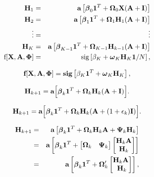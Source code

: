 \documentclass[letterpaper,twoside,openany, titlepage,oldfontcommands,titles,dvipsnames]{memoir}
\begin{document}
\begin{eqnarray}\label{eq:graph_simple_example}
 \mathbf{H}_{1} &=& \mbox{\bf a}\left[\boldsymbol\beta_{0}\mathbf{1}^{T}+\boldsymbol\Omega_{0}\mathbf{X}(\mathbf{A}+\mathbf{I})\right]\nonumber \\
 \mathbf{H}_{2} &=& \mbox{\bf a}\left[\boldsymbol\beta_{1}\mathbf{1}^{T} + \boldsymbol\Omega_{1}\mathbf{H}_{1}(\mathbf{A}+\mathbf{I}) \right]\nonumber \\
 \vdots &=& \vdots \nonumber \\
 \mathbf{H}_{K} &=& \mbox{\bf a}\left[\boldsymbol\beta_{K-1}\mathbf{1}^{T} + \boldsymbol\Omega_{K-1}\mathbf{H}_{k-1}(\mathbf{A}+\mathbf{I}) \right]\nonumber \\
 \mbox{f}[\mathbf{X},\mathbf{A},\boldsymbol\Phi] &=& \mbox{sig}\left[\beta_{K}+\boldsymbol\omega_{K}\mathbf{H}_{K}\mathbf{1}/N\right],
 \end{eqnarray}

\begin{eqnarray}\label{eq:graph_node_matrix}
 \mbox{\bf f}[\mathbf{X},\mathbf{A},\boldsymbol\Phi] = \mbox{\bf sig}
 \left[\beta_{K}\mathbf{1}^{T}+\boldsymbol\omega_K\mathbf{H}_K\right],
 \end{eqnarray}

\begin{eqnarray}
 \mathbf{H}_{k+1} = \mbox{\bf a}\Bigl[\boldsymbol\beta_{k}\mathbf{1}^{T} + \boldsymbol\Omega_{k} \mathbf{H}_{k}(\mathbf{A}+\mathbf{I}) \Bigr].
 \end{eqnarray}

\begin{eqnarray}
 \mathbf{H}_{k+1} = \mbox{\bf a}\Bigl[\boldsymbol\beta_{k}\mathbf{1}^{T} + \boldsymbol\Omega_{k} \mathbf{H}_{k}(\mathbf{A}+ (1+\epsilon_{k})\mathbf{I}) \Bigr].
 \end{eqnarray}

\begin{eqnarray}
 \mathbf{H}_{k+1} &=& \mbox{\bf a}\left[\boldsymbol\beta_{k}\mathbf{1}^{T} +  \boldsymbol\Omega_{k} \mathbf{H}_{k}\mathbf{A} + \boldsymbol\Psi_{k}\mathbf{H}_k \right]\nonumber \\
 &=& \mbox{\bf a}\left[\boldsymbol\beta_{k}\mathbf{1}^{T} + \begin{bmatrix}\boldsymbol\Omega_{k}&\boldsymbol\Psi_{k}\end{bmatrix} \begin{bmatrix}\mathbf{H}_{k}\mathbf{A}\\ \mathbf{H}_{k}\end{bmatrix} \right]\nonumber \\
 &=& \mbox{\bf a}\left[\boldsymbol\beta_{k}\mathbf{1}^{T} +\boldsymbol\Omega_{k}' \begin{bmatrix}\mathbf{H}_{k}\mathbf{A}\\\ \mathbf{H}_{k}\end{bmatrix} \right],
 \end{eqnarray}
\end{document}
